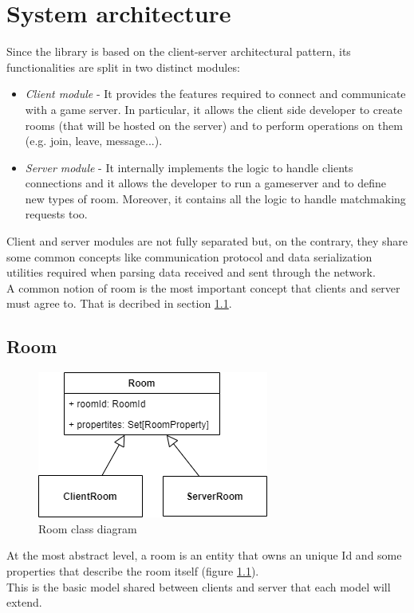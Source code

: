\chapter{System architecture}
Since the library is based on the client-server architectural pattern, its functionalities are split in two distinct modules:
\begin{itemize}
	\item \textit{Client module} - It provides the features required to connect and communicate with a game server. In particular, it allows the client side developer to create rooms (that will be hosted on the server) and to perform operations on them (e.g. join, leave, message...).
	\item \textit{Server module} - It internally implements the logic to handle clients connections and it allows the developer to run a gameserver and to define new types of room. Moreover, it contains all the logic to handle matchmaking requests too.
\end{itemize}

Client and server modules are not fully separated but, on the contrary, they share some common concepts like communication protocol and data serialization utilities required when parsing data received and sent through the network.
\\
A common notion of room is the most important concept that clients and server must agree to. That is decribed in section \ref{room-arch}.

\section{Room} \label{room-arch}


\begin{figure}[H]
	\centering
	\includegraphics[scale=0.7]{images/3-architecture/room-class-3.png}
	\caption{Room class diagram}
	\label{fig:room_classes}
\end{figure}


At the most abstract level, a room is an entity that owns an unique Id and some properties that describe the room itself (figure \ref{fig:room_classes}).
\\
This is the basic model shared between clients and server that each model will extend.


